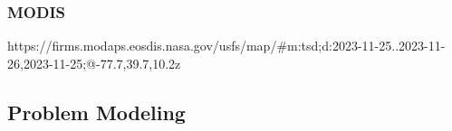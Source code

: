 \documentclass[preprint,review, 11pt,3p,authoryear]{elsarticle}
\newcommand{\rev}{\color{black}} %
\begin{document}
\subsubsection{MODIS}

https://firms.modaps.eosdis.nasa.gov/usfs/map/#m:tsd;d:2023-11-25..2023-11-26,2023-11-25;@-77.7,39.7,10.2z

\subsection{Problem Modeling}









\end{document}
